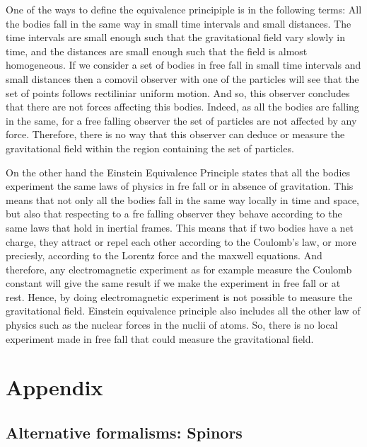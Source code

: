 \documentclass[10pt, letterpaper, oneside]{book}
\theoremstyle{theorem} %
\theoremstyle{theorem} %
\theoremstyle{definition}
\theoremstyle{remark}
\theoremstyle{definition}
\theoremstyle{definition}
\theoremstyle{theorem}
\begin{document}
One of the ways to define the equivalence principiple is in the following terms: All the bodies fall in the same way in small time intervals and small distances. The time intervals are small enough such that the gravitational field vary slowly in time, and the distances are small enough such that the field is almost homogeneous. If we consider a set of bodies in free fall in small time intervals and small distances then a comovil observer with one of the particles will see that the set of points follows rectiliniar uniform motion. And so, this observer concludes that there are not forces affecting this bodies. Indeed, as all the bodies are falling in the same, for a free falling observer the set of particles are not affected by any force. Therefore, there is no way that this observer can deduce or measure the gravitational field within the region containing the set of particles.

On the other hand the Einstein Equivalence Principle states that all the bodies experiment the same laws of physics in fre fall or in absence of gravitation. This means that not only all the bodies fall in the same way locally in time and space, but also that respecting to a fre falling observer they behave according to the same laws that hold in inertial frames. This means that if two bodies have a net charge, they attract or repel each other according to the Coulomb's 	law, or more preciesly, according to the Lorentz force and the maxwell equations. And therefore, any electromagnetic experiment as for example measure the Coulomb constant will give the same result if we make the experiment in free fall or at rest. Hence, by doing electromagnetic experiment is not possible to measure the gravitational field. Einstein equivalence principle also includes all the other law of physics such as the nuclear forces in the nuclii of atoms. So, there is no local experiment made in free fall that could measure the gravitational field. 

\section{Appendix}
\subsection{Alternative formalisms: Spinors}

\end{document}
